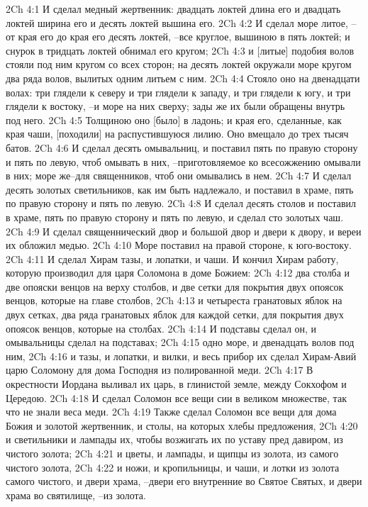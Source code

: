 2Ch 4:1  И сделал медный жертвенник: двадцать локтей длина его и двадцать локтей ширина его и десять локтей вышина его.
2Ch 4:2  И сделал море литое, --от края его до края его десять локтей, --все круглое, вышиною в пять локтей; и снурок в тридцать локтей обнимал его кругом;
2Ch 4:3  и [литые] подобия волов стояли под ним кругом со всех сторон; на десять локтей окружали море кругом два ряда волов, вылитых одним литьем с ним.
2Ch 4:4  Стояло оно на двенадцати волах: три глядели к северу и три глядели к западу, и три глядели к югу, и три глядели к востоку, --и море на них сверху; зады же их были обращены внутрь под него.
2Ch 4:5  Толщиною оно [было] в ладонь; и края его, сделанные, как края чаши, [походили] на распустившуюся лилию. Оно вмещало до трех тысяч батов.
2Ch 4:6  И сделал десять омывальниц, и поставил пять по правую сторону и пять по левую, чтоб омывать в них, --приготовляемое ко всесожжению омывали в них; море же--для священников, чтоб они омывались в нем.
2Ch 4:7  И сделал десять золотых светильников, как им быть надлежало, и поставил в храме, пять по правую сторону и пять по левую.
2Ch 4:8  И сделал десять столов и поставил в храме, пять по правую сторону и пять по левую, и сделал сто золотых чаш.
2Ch 4:9  И сделал священнический двор и большой двор и двери к двору, и вереи их обложил медью.
2Ch 4:10  Море поставил на правой стороне, к юго-востоку.
2Ch 4:11  И сделал Хирам тазы, и лопатки, и чаши. И кончил Хирам работу, которую производил для царя Соломона в доме Божием:
2Ch 4:12  два столба и две опояски венцов на верху столбов, и две сетки для покрытия двух опоясок венцов, которые на главе столбов,
2Ch 4:13  и четыреста гранатовых яблок на двух сетках, два ряда гранатовых яблок для каждой сетки, для покрытия двух опоясок венцов, которые на столбах.
2Ch 4:14  И подставы сделал он, и омывальницы сделал на подставах;
2Ch 4:15  одно море, и двенадцать волов под ним,
2Ch 4:16  и тазы, и лопатки, и вилки, и весь прибор их сделал Хирам-Авий царю Соломону для дома Господня из полированной меди.
2Ch 4:17  В окрестности Иордана выливал их царь, в глинистой земле, между Сокхофом и Цередою.
2Ch 4:18  И сделал Соломон все вещи сии в великом множестве, так что не знали веса меди.
2Ch 4:19  Также сделал Соломон все вещи для дома Божия и золотой жертвенник, и столы, на которых хлебы предложения,
2Ch 4:20  и светильники и лампады их, чтобы возжигать их по уставу пред давиром, из чистого золота;
2Ch 4:21  и цветы, и лампады, и щипцы из золота, из самого чистого золота,
2Ch 4:22  и ножи, и кропильницы, и чаши, и лотки из золота самого чистого, и двери храма, --двери его внутренние во Святое Святых, и двери храма во святилище, --из золота.
